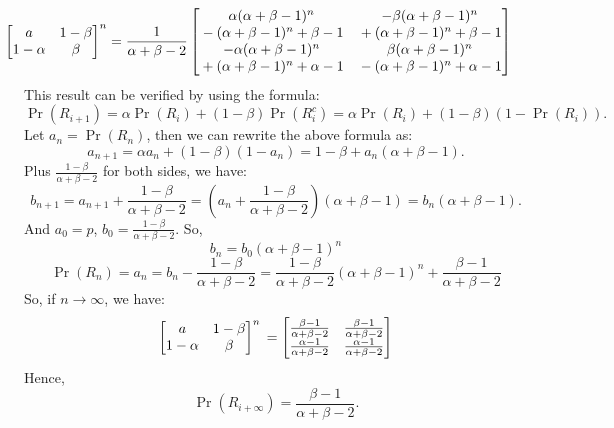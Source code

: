 \documentclass[14pt]{elegantbook}
\begin{document}
\begin{solution}
\begin{enumerate}[(a)]
\begin{align*}
                \hspace{-25pt}\begin{bmatrix}
                    a&1-\beta\\
                    1-\alpha&\beta
                \end{bmatrix}^n=\frac{1}{\alpha + \beta - 2}\begin{bmatrix}
                    \alpha (\alpha + \beta - 1)^n  & -\beta (\alpha + \beta - 1)^n  \\{}- (\alpha + \beta - 1)^n + \beta - 1 &{}+ (\alpha + \beta - 1)^n + \beta - 1\\
                    -\alpha (\alpha + \beta - 1)^n  &{} \beta (\alpha + \beta - 1)^n  \\{}+ (\alpha + \beta - 1)^n + \alpha - 1 &{}- (\alpha + \beta - 1)^n + \alpha - 1
                \end{bmatrix}
            \end{align*}
            This result can be verified by using the formula:
            \[\Pr(R_{i+1})=\alpha \Pr(R_{i})+(1-\beta)\Pr(R_{i}^c)=\alpha \Pr(R_{i})+(1-\beta)(1-\Pr(R_{i})). \]
            Let $a_{n}=\Pr(R_{n})$, then we can rewrite the above formula as:
            \[a_{n+1}=\alpha a_n+(1-\beta)(1-a_n)=1-\beta+a_n(\alpha+\beta-1). \]
            Plus $\frac{1-\beta}{\alpha+\beta-2}$ for both sides, we have:
            \[b_{n+1}=a_{n+1}+\frac{1-\beta}{\alpha+\beta-2}=\left(a_n+\frac{1-\beta}{\alpha+\beta-2}\right)(\alpha+\beta-1)=b_n(\alpha+\beta-1). \]
            And $a_0=p$, $b_0=\frac{1-\beta}{\alpha+\beta-2}$. So, 
            \[b_n=b_0(\alpha+\beta-1)^n\]
            \[\Pr(R_{n})=a_n=b_n-\frac{1-\beta}{\alpha+\beta-2}=\frac{1-\beta}{\alpha+\beta-2}(\alpha+\beta-1)^n+\frac{\beta-1}{\alpha+\beta-2}\]
            So, if $n\to\infty$, we have:
            \[\begin{bmatrix}
                a&1-\beta\\
                1-\alpha&\beta
            \end{bmatrix}^n\\=\begin{bmatrix}
                \frac{\beta-1}{\alpha+\beta-2}&\frac{\beta-1}{\alpha+\beta-2}\\
                \frac{\alpha-1}{\alpha+\beta-2}&\frac{\alpha-1}{\alpha+\beta-2}
            \end{bmatrix}\]
            Hence, \[
                \Pr(R_{i+\infty})=\frac{\beta-1}{\alpha+\beta-2}. 
            \]
        \end{enumerate}
    \end{solution}
    
\end{document}
